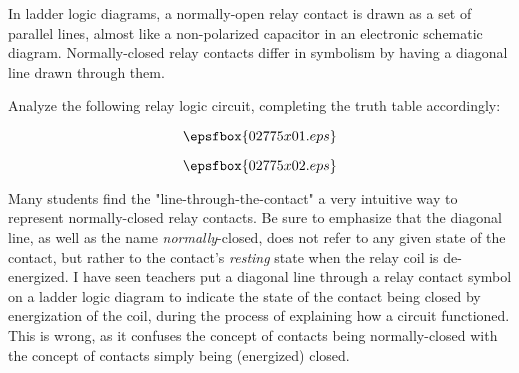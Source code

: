 

In ladder logic diagrams, a normally-open relay contact is drawn as a set of parallel lines, almost like a non-polarized capacitor in an electronic schematic diagram.  Normally-closed relay contacts differ in symbolism by having a diagonal line drawn through them.

Analyze the following relay logic circuit, completing the truth table accordingly:

$$\epsfbox{02775x01.eps}$$







$$\epsfbox{02775x02.eps}$$







Many students find the "line-through-the-contact" a very intuitive way to represent normally-closed relay contacts.  Be sure to emphasize that the diagonal line, as well as the name {\it normally}-closed, does not refer to any given state of the contact, but rather to the contact's {\it resting} state when the relay coil is de-energized.  I have seen teachers put a diagonal line through a relay contact symbol on a ladder logic diagram to indicate the state of the contact being closed by energization of the coil, during the process of explaining how a circuit functioned.  This is wrong, as it confuses the concept of contacts being normally-closed with the concept of contacts simply being (energized) closed.




